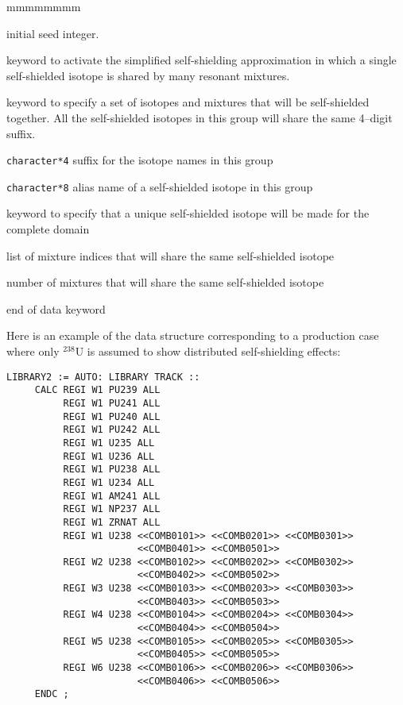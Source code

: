 \begin{ListeDeDescription}{mmmmmmmm}
\item[\dusa{iseed}] initial seed integer.

\item[\moc{CALC}] keyword to activate the simplified self-shielding
approximation in which a single self-shielded isotope is shared by many
resonant mixtures.

\item[\moc{REGI}] keyword to specify a set of isotopes and mixtures that
will be self-shielded together. All the self-shielded isotopes in this group
will share the same 4--digit suffix.

\item[\dusa{suffix}] {\tt character*4} suffix for the isotope names in this
group

\item[\dusa{isot}] {\tt character*8} alias name of a self-shielded isotope in this
group

\item[\moc{ALL}] keyword to specify that a unique self-shielded isotope will be
made for the complete domain

\item[\dusa{imix}] list of mixture indices that will share the same self-shielded
isotope

\item[\dusa{nmix}] number of mixtures that will share the same self-shielded
isotope

\item[\moc{ENDC}] end of  data keyword

\end{ListeDeDescription}

\vskip 0.15cm

Here is an example of the data structure corresponding to a production case where
only $^{238}$U is assumed to show distributed self-shielding effects:

\begin{verbatim}
LIBRARY2 := AUTO: LIBRARY TRACK ::
     CALC REGI W1 PU239 ALL
          REGI W1 PU241 ALL
          REGI W1 PU240 ALL
          REGI W1 PU242 ALL
          REGI W1 U235 ALL
          REGI W1 U236 ALL
          REGI W1 PU238 ALL
          REGI W1 U234 ALL
          REGI W1 AM241 ALL
          REGI W1 NP237 ALL
          REGI W1 ZRNAT ALL
          REGI W1 U238 <<COMB0101>> <<COMB0201>> <<COMB0301>>
                       <<COMB0401>> <<COMB0501>>
          REGI W2 U238 <<COMB0102>> <<COMB0202>> <<COMB0302>>
                       <<COMB0402>> <<COMB0502>>
          REGI W3 U238 <<COMB0103>> <<COMB0203>> <<COMB0303>>
                       <<COMB0403>> <<COMB0503>>
          REGI W4 U238 <<COMB0104>> <<COMB0204>> <<COMB0304>>
                       <<COMB0404>> <<COMB0504>>
          REGI W5 U238 <<COMB0105>> <<COMB0205>> <<COMB0305>>
                       <<COMB0405>> <<COMB0505>>
          REGI W6 U238 <<COMB0106>> <<COMB0206>> <<COMB0306>>
                       <<COMB0406>> <<COMB0506>>
     ENDC ;
\end{verbatim}

